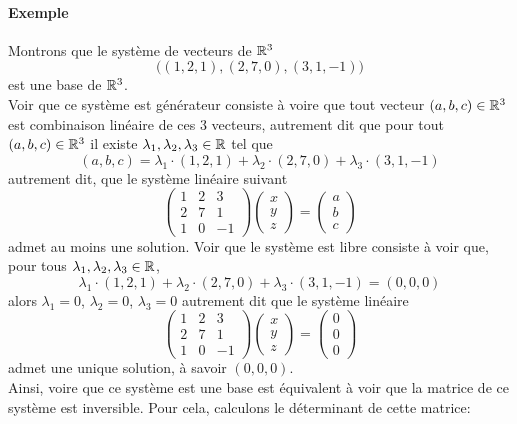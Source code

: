 \paragraph{Exemple} Montrons que le système de vecteurs de $\mathbb{R}^3$ 
$$\big( (1, 2, 1), (2, 7, 0), (3, 1, -1) \big)$$
est une base de $\mathbb{R}^3$. \\
Voir que ce système est générateur consiste à voire que tout vecteur $(a, b, c) \in \mathbb{R}^3$ est combinaison linéaire de ces 3 vecteurs, autrement dit que pour tout $(a, b, c) \in \mathbb{R}^3$ il existe $\lambda_1, \lambda_2, \lambda_3 \in \mathbb{R}$ tel que 
$$(a, b, c) = \lambda_1 \cdot (1, 2, 1) +\lambda_2 \cdot (2, 7, 0) + \lambda_3 \cdot (3, 1, -1)$$
autrement dit, que le système linéaire suivant
$$\begin{pmatrix}
  1 & 2 & 3 \\
  2 & 7 & 1 \\
  1 & 0 & -1
\end{pmatrix}
\begin{pmatrix}
  x \\
  y \\
  z 
\end{pmatrix}
=
\begin{pmatrix}
  a \\
  b \\
  c
\end{pmatrix}$$
admet au moins une solution. Voir que le système est libre consiste à voir que, pour tous $\lambda_1, \lambda_2, \lambda_3 \in \mathbb{R}$, 
$$\lambda_1 \cdot (1, 2, 1) +\lambda_2 \cdot (2, 7, 0) + \lambda_3 \cdot (3, 1, -1) = (0, 0, 0)$$
alors $\lambda_1=0$, $\lambda_2=0$, $\lambda_3=0$ autrement dit que le système linéaire
$$\begin{pmatrix}
  1 & 2 & 3 \\
  2 & 7 & 1 \\
  1 & 0 & -1
\end{pmatrix}
\begin{pmatrix}
  x \\
  y \\
  z 
\end{pmatrix}
=
\begin{pmatrix}
  0 \\
  0 \\
  0
\end{pmatrix}$$
admet une unique solution, à savoir $(0, 0, 0)$. \\
Ainsi, voire que ce système est une base est équivalent à voir que la matrice de ce système est inversible. Pour cela, calculons le déterminant de cette matrice:
